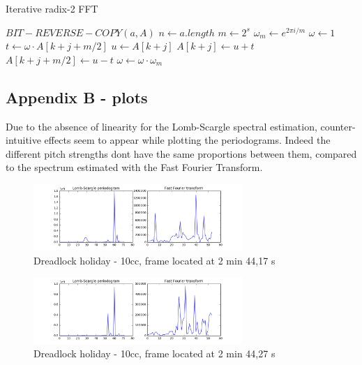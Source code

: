 \documentclass[letterpaper]{article}
\begin{document}
\begin{algorithm}
\caption{Iterative radix-2 FFT}\label{fft}
\begin{algorithmic}[1]
\State $BIT-REVERSE-COPY(a, A)$
\State $n \gets a.length$
	\State $m \gets 2^{s}$
	\State $\omega_m \gets e^{2\pi i / m} $
		\State $\omega \gets 1$
			\State $t \gets \omega \cdot A[k + j + m/2]$
			\State $u \gets A[k + j]$
			\State $A[k + j] \gets u + t$
			\State $A[k + j + m/2] \gets u - t$
			\State $\omega \gets \omega \cdot \omega_m$
		\EndFor
	\EndFor
\EndFor
\EndProcedure
\end{algorithmic}
\end{algorithm}

\subsection{Appendix B - plots}

Due to the absence of linearity for the Lomb-Scargle spectral estimation, counter-intuitive effects seem to appear while plotting the periodograms. Indeed the different pitch strengths don\textquotesingle t have the same proportions between them, compared to the spectrum estimated with the Fast Fourier Transform.

\begin{figure}[h!]
\begin{center}
\includegraphics[width=3.1in,angle=0]{imgs/1frame.png}
\caption{Dreadlock holiday - 10cc, frame located at 2 min 44,17 s}
\label{fig:frame1}
\end{center}
\end{figure}

\begin{figure}[h!]
\begin{center}
\includegraphics[width=3.1in,angle=0]{imgs/2frame.png}
\caption{Dreadlock holiday - 10cc, frame located at 2 min 44,27 s}
\label{fig:frame2}
\end{center}
\end{figure}
\end{document}
